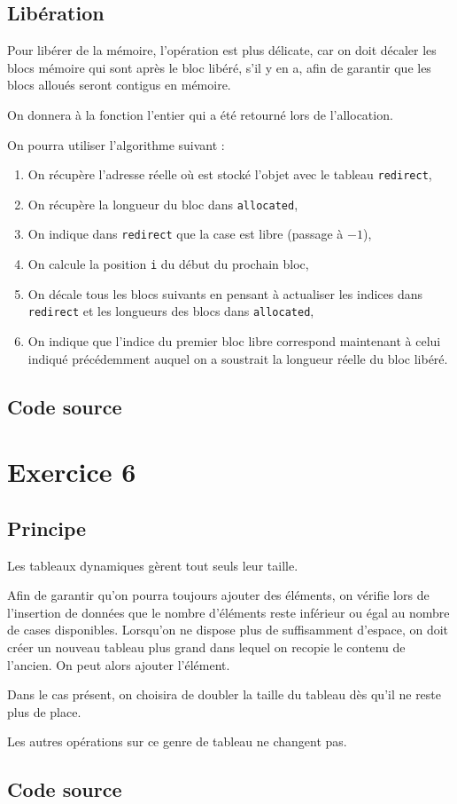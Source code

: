 \documentclass{report}
\newcommand{\code}{\lstinline[style=customjava]}
\begin{document}
    \section{Libération}
      Pour libérer de la mémoire, l'opération est plus délicate, car on doit décaler les blocs mémoire qui sont après le bloc libéré, s'il y en a, afin de garantir que les blocs alloués seront contigus en mémoire.
      
      On donnera à la fonction l'entier qui a été retourné lors de l'allocation.
      
      On pourra utiliser l'algorithme suivant :
      \begin{enumerate}
	\item On récupère l'adresse réelle où est stocké l'objet avec le tableau \code{redirect},
	\item On récupère la longueur du bloc dans \code{allocated},
	\item On indique dans \code{redirect} que la case est libre (passage à $-1$),
	\item On calcule la position \code{i} du début du prochain bloc,
	\item On décale tous les blocs suivants en pensant à actualiser les indices dans \code{redirect} et les longueurs des blocs dans \code{allocated},
	\item On indique que l'indice du premier bloc libre correspond maintenant à celui indiqué précédemment auquel on a soustrait la longueur réelle du bloc libéré.
      \end{enumerate}
    \section{Code source}
      
  \chapter*{Exercice 6}
  \addtocounter{chapter}{3}
  \setcounter{section}{0}
    \section{Principe}
      Les tableaux dynamiques gèrent tout seuls leur taille.
      
      Afin de garantir qu'on pourra toujours ajouter des éléments, on vérifie lors de l'insertion de données que le nombre d'éléments reste inférieur ou égal au nombre de cases disponibles. Lorsqu'on ne dispose plus de suffisamment d'espace, on doit créer un nouveau tableau plus grand dans lequel on recopie le contenu de l'ancien. On peut alors ajouter l'élément.
      
      Dans le cas présent, on choisira de doubler la taille du tableau dès qu'il ne reste plus de place.
      
      Les autres opérations sur ce genre de tableau ne changent pas.
    \section{Code source}
      
\end{document}
